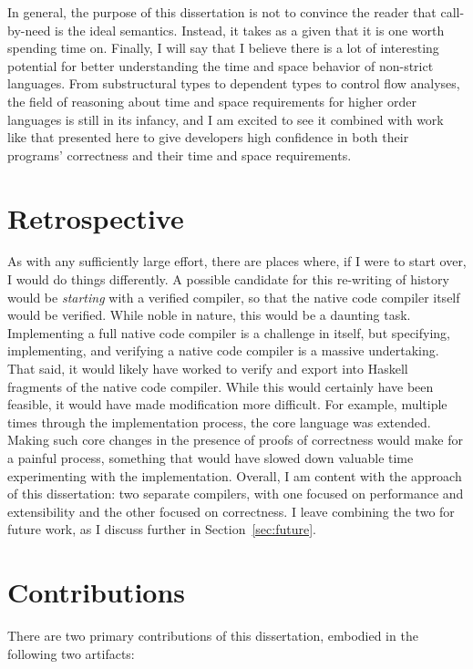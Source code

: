 In general, the purpose of this dissertation is not to convince the reader that
call-by-need is the ideal semantics. Instead, it takes as a given that it is one
worth spending time on. Finally, I will say that I believe there is a lot of
interesting potential for better understanding the time and space behavior of
non-strict languages. From substructural types to dependent types to control
flow analyses, the field of reasoning about time and space requirements for
higher order languages is still in its infancy, and I am excited to see it
combined with work like that presented here to give developers high confidence
in both their programs' correctness and their time and space requirements. 

\section{Retrospective}

As with any sufficiently large effort, there are places where, if I were to
start over, I would do things differently. A possible candidate for this
re-writing of history would be \emph{starting} with a verified compiler, so that
the native code compiler itself would be verified. While noble in nature, this
would be a daunting task. Implementing a full native code compiler is a
challenge in itself, but specifying, implementing, and verifying a native code
compiler is a massive undertaking. That said, it would likely have worked to
verify and export into Haskell fragments of the native code compiler. While this
would certainly have been feasible, it would have made modification more
difficult. For example, multiple times through the implementation process, the
core language was extended. Making such core changes in the presence of proofs
of correctness would make for a painful process, something that would have
slowed down valuable time experimenting with the implementation. Overall, I am
content with the approach of this dissertation: two separate compilers, with one
focused on performance and extensibility and the other focused on correctness. I
leave combining the two for future work, as I discuss further in
Section~\ref{sec:future}.

\section{Contributions}

There are two primary contributions of this dissertation, embodied in the
following two artifacts:

